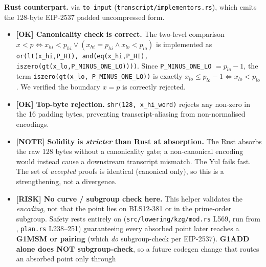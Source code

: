 \textbf{Rust counterpart.} 
via \texttt{to\_input} (\texttt{transcript/\allowbreak{}implementors.rs}), which
emits the 128-byte EIP-2537 padded uncompressed form.

\begin{itemize}
  \item \textcolor{tracegreen}{\textbf{[OK] Canonicality check is correct.}}
        The two-level comparison
        $x < p \iff x_{hi} < p_{hi} \lor (x_{hi}=p_{hi} \land x_{lo} < p_{lo})$
        is implemented as
        \texttt{or(lt(x\_\allowbreak{}hi,P\_\allowbreak{}HI), and(eq(x\_\allowbreak{}hi,P\_\allowbreak{}HI), iszero(gt(x\_\allowbreak{}lo,P\_\allowbreak{}MINUS\_\allowbreak{}ONE\_\allowbreak{}LO))))}.
        Since \texttt{P\_MINUS\_ONE\_LO} $= p_{lo}-1$, the term
        \texttt{iszero(gt(x\_\allowbreak{}lo, P\_\allowbreak{}MINUS\_\allowbreak{}ONE\_\allowbreak{}LO))} is exactly
        $x_{lo} \le p_{lo}-1 \iff x_{lo} < p_{lo}$. We verified the
        boundary $x=p$ is correctly rejected.
  \item \textcolor{tracegreen}{\textbf{[OK] Top-byte rejection.}}
        \texttt{shr(128, x\_\allowbreak{}hi\_\allowbreak{}word)} rejects any non-zero in the 16
        padding bytes, preventing transcript-aliasing from
        non-normalised encodings.
  \item \textcolor{mathpurple}{\textbf{[NOTE] Solidity is \emph{stricter}
        than Rust at absorption.}} The Rust absorbs the raw 128 bytes
        without a canonicality gate; a non-canonical encoding would
        instead cause a downstream transcript mismatch. The Yul fails
        fast. The set of \emph{accepted} proofs is identical (canonical
        only), so this is a strengthening, not a divergence.
  \item \textcolor{rustorange}{\textbf{[RISK] No curve / subgroup check
        here.}} This helper validates the \emph{encoding}, not that the
        point lies on BLS12-381 or in the prime-order subgroup. Safety
        rests entirely on
        (\texttt{src/\allowbreak{}lowering/\allowbreak{}kzg/\allowbreak{}mod.rs} L569, run from
        ,
        \texttt{plan.rs} L238--251)
        guaranteeing every absorbed point later reaches a
        \textbf{G1MSM or pairing} (which \emph{do} subgroup-check per
        EIP-2537). \textbf{G1ADD alone does NOT subgroup-check}, so a
        future codegen change that routes an absorbed point only through

\end{itemize}
